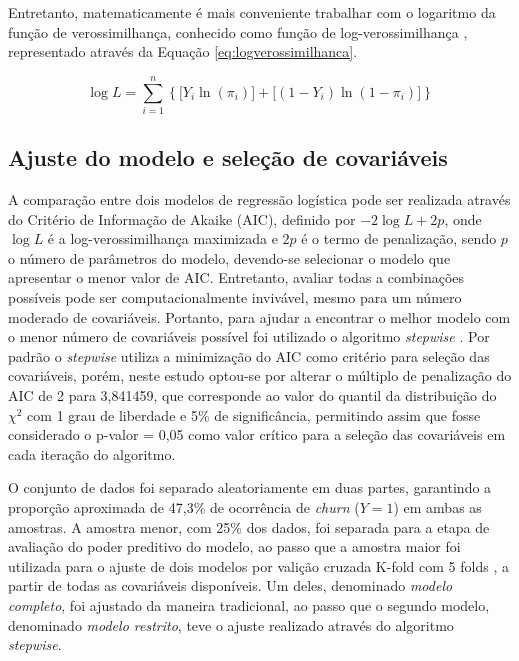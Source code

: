 \documentclass[twocolumn]{rbef}
\newcommand{\1}{\mathbbm{1}}
\begin{document}
Entretanto, matematicamente é mais conveniente trabalhar com o logaritmo da função de verossimilhança, conhecido como função de log-verossimilhança \cite{Favero2017,Botelho2010}, representado através da Equação \eqref{eq:logverossimilhanca}.

\begin{equation}
\log L = \sum_{i=1}^{n} \left\{ \big[Y_i\ln(\pi_i)\big] + \big[(1-Y_i)\ln(1-\pi_i)\big] \right\}\label{eq:logverossimilhanca}
\end{equation}

\hypertarget{ajuste-do-modelo-e-seleuxe7uxe3o-de-covariuxe1veis}{%
\subsection{Ajuste do modelo e seleção de covariáveis}\label{ajuste-do-modelo-e-seleuxe7uxe3o-de-covariuxe1veis}}

A comparação entre dois modelos de regressão logística pode ser realizada através do Critério de Informação de Akaike (AIC), definido por \(-2\log L + 2p\), onde \(\log L\) é a log-verossimilhança maximizada e \(2p\) é o termo de penalização, sendo \(p\) o número de parâmetros do modelo, devendo-se selecionar o modelo que apresentar o menor valor de AIC. Entretanto, avaliar todas a combinações possíveis pode ser computacionalmente invivável, mesmo para um número moderado de covariáveis. Portanto, para ajudar a encontrar o melhor modelo com o menor número de covariáveis possível foi utilizado o algoritmo \textit{stepwise} \cite{Taconeli2019}. Por padrão o \textit{stepwise} utiliza a minimização do AIC como critério para seleção das covariáveis, porém, neste estudo optou-se por alterar o múltiplo de penalização do AIC de 2 para 3,841459, que corresponde ao valor do quantil da distribuição do \(\chi^2\) com 1 grau de liberdade e 5\% de significância, permitindo assim que fosse considerado o p-valor = 0,05 como valor crítico para a seleção das covariáveis em cada iteração do algoritmo.

O conjunto de dados foi separado aleatoriamente em duas partes, garantindo a proporção aproximada de 47,3\% de ocorrência de \textit{churn} (\(Y=1\)) em ambas as amostras. A amostra menor, com 25\% dos dados, foi separada para a etapa de avaliação do poder preditivo do modelo, ao passo que a amostra maior foi utilizada para o ajuste de dois modelos por valição cruzada K-fold com 5 folds \cite{Kohavi1995}, a partir de todas as covariáveis disponíveis. Um deles, denominado \textit{modelo completo}, foi ajustado da maneira tradicional, ao passo que o segundo modelo, denominado \textit{modelo restrito}, teve o ajuste realizado através do algoritmo \textit{stepwise}.
\end{document}
